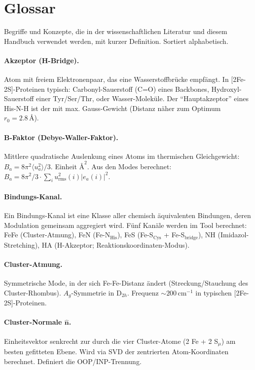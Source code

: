 \documentclass[11pt,a4paper,twoside]{article}
\providecommand{\angstrom}{\text{\AA}}    %
\theoremstyle{remark}
\begin{document}
\section{Glossar}
\label{app:glossary}

Begriffe und Konzepte, die in der wissenschaftlichen Literatur und
diesem Handbuch verwendet werden, mit kurzer Definition. Sortiert
alphabetisch.

\paragraph{Akzeptor (H-Bridge).}
Atom mit freiem Elektronenpaar, das eine Wasserstoffbr\"ucke
empf\"angt. In [2Fe-2S]-Proteinen typisch: Carbonyl-Sauerstoff
(C=O) eines Backbones, Hydroxyl-Sauerstoff einer Tyr/Ser/Thr,
oder Wasser-Molek\"ule. Der "`Hauptakzeptor"' eines His-N-H ist
der mit max. Gauss-Gewicht (Distanz n\"aher zum Optimum
$r_0 = 2.8\,\angstrom$).

\paragraph{B-Faktor (Debye-Waller-Faktor).}
Mittlere quadratische Auslenkung eines Atoms im thermischen
Gleichgewicht: $B_a = 8\pi^2\langle u_a^2\rangle/3$. Einheit
$\angstrom^2$. Aus den Modes berechnet:
$B_a = 8\pi^2/3 \cdot \sum_i u_\text{rms}^2(i) |e_a(i)|^2$.

\paragraph{Bindungs-Kanal.}
Ein Bindungs-Kanal ist eine Klasse aller chemisch \"aquivalenten
Bindungen, deren Modulation gemeinsam aggregiert wird. F\"unf
Kan\"ale werden im Tool berechnet: FeFe (Cluster-Atmung), FeN
(Fe-N$_\text{His}$), FeS (Fe-S$_\text{Cys}$ + Fe-S$_\text{bridge}$),
NH (Imidazol-Stretching), HA (H-Akzeptor; Reaktionskoordinaten-Modus).

\paragraph{Cluster-Atmung.}
Symmetrische Mode, in der sich Fe-Fe-Distanz \"andert
(Streckung/Stauchung des Cluster-Rhombus). $A_g$-Symmetrie in
D$_{2h}$. Frequenz $\sim 200$\,cm$^{-1}$ in
typischen [2Fe-2S]-Proteinen.

\paragraph{Cluster-Normale $\hat{\mathbf{n}}$.}
Einheitsvektor senkrecht zur durch die vier Cluster-Atome (2 Fe + 2 S$_\mu$)
am besten gefitteten Ebene. Wird via SVD der zentrierten
Atom-Koordinaten berechnet. Definiert die OOP/INP-Trennung.
\end{document}
